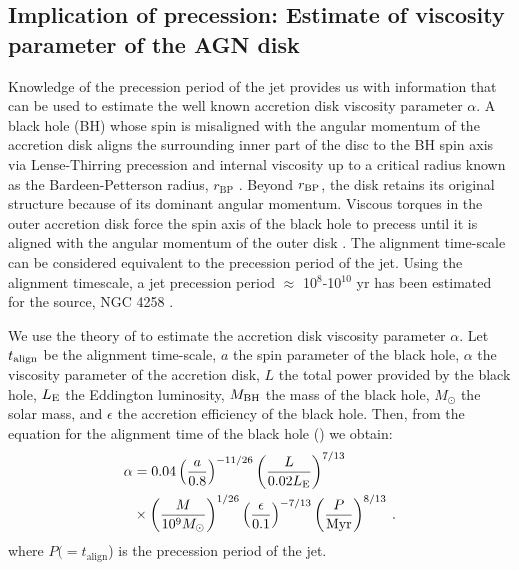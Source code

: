 \documentclass[useAMS, usenatbib]{mn2e}
\begin{document}
%

%
%
\subsection{Implication of precession: Estimate of viscosity parameter of the AGN disk}
Knowledge of the precession period of the jet provides us with information that can be used to estimate the well known accretion disk viscosity parameter $\alpha$. A black hole (BH) whose spin is misaligned with the angular momentum of the accretion disk aligns the surrounding inner part of the disc to the BH spin axis via Lense-Thirring precession and internal viscosity up to a critical radius known as the Bardeen-Petterson radius, $r_\mathrm{BP}$ \citep{bardeen75}. Beyond $r_{\rm BP}$, the disk retains its original structure because of its dominant angular momentum. Viscous torques in the outer accretion disk force the spin axis of the black hole to precess until it is aligned with the angular momentum of the outer disk \citep{rees78, scheuer96, natarajan98, caproni07}. The alignment time-scale can be considered equivalent to the precession period of the jet. Using the alignment timescale, a jet precession period $\approx$ 10$^8$-10$^{10}$ yr has been estimated for the source, NGC 4258 \citep{caproni07}. 

We use the theory of \citet{natarajan98} to estimate the accretion disk viscosity parameter $\alpha$. Let $t_{\rm align}$ be the alignment time-scale, $a$ the spin parameter of the black hole, $\alpha$ the viscosity parameter of the accretion disk, $L$ the total power provided by the black hole,
$L_{\rm E}$ the Eddington luminosity, $M_{\rm BH}$ the mass of the black hole, $M_{\odot}$ the solar mass, and $\epsilon$ the accretion efficiency of the black hole. Then, from the equation for the alignment time of the black hole (\citealt[][equation 2.16]{natarajan98}) we obtain:
\begin{align}
\alpha & = 0.04 \left(\frac{a}{0.8}\right)^{-11/26} \left(\frac{L}{0.02 L_{\rm E}}\right)^{7/13} \\ \nonumber 
           & \times \left(\frac{M}{ 10^9 M_{\odot}}\right)^{1/26}  \left(\frac{\epsilon}{0.1}\right)^{-7/13} \left(\frac{P}{\rm Myr}\right)^{8/13}\:.
\end{align}
where $P(=t_\mathrm{align}$) is the precession period of the jet.
\end{document}
